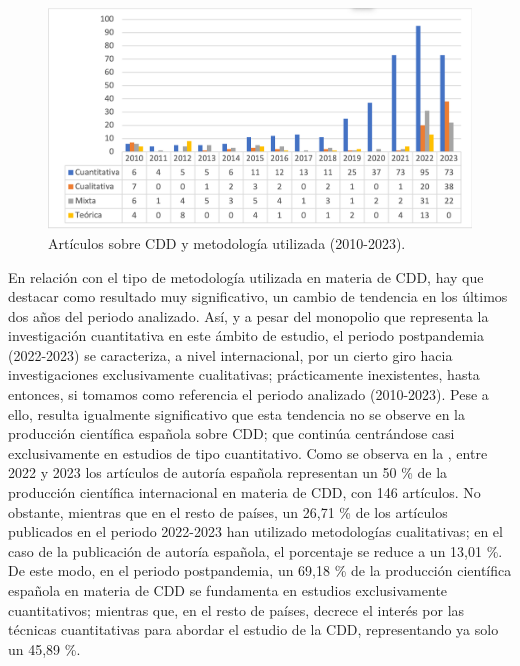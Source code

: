 \documentclass[spanish]{textolivre}
\begin{document}
\begin{figure}[h]
    \centering
    \begin{minipage}{.8\textwidth} 
    \includegraphics[width=\linewidth]{images/image4.png}
    \caption{Artículos sobre CDD y metodología utilizada (2010-2023).}
    \label{fig-4}
    \end{minipage}
\end{figure}

En relación con el tipo de metodología utilizada en materia de CDD, hay que destacar como resultado muy significativo, un cambio de tendencia en los últimos dos años del periodo analizado. Así, y a pesar del monopolio que representa la investigación cuantitativa en este ámbito de estudio, el periodo postpandemia (2022-2023) se caracteriza, a nivel internacional, por un cierto giro hacia investigaciones exclusivamente cualitativas; prácticamente inexistentes, hasta entonces, si tomamos como referencia el periodo analizado (2010-2023). Pese a ello, resulta igualmente significativo que esta tendencia no se observe en la producción científica española sobre CDD; que continúa centrándose casi exclusivamente en estudios de tipo cuantitativo. Como se observa en la , entre 2022 y 2023 los artículos de autoría española representan un 50 \% de la producción científica internacional en materia de CDD, con 146 artículos. No obstante, mientras que en el resto de países, un 26,71 \% de los artículos publicados en el periodo 2022-2023 han utilizado metodologías cualitativas; en el caso de la publicación de autoría española, el porcentaje se reduce a un 13,01 \%. De este modo, en el periodo postpandemia, un 69,18 \% de la producción científica española en materia de CDD se fundamenta en estudios exclusivamente cuantitativos; mientras que, en el resto de países, decrece el interés por las técnicas cuantitativas para abordar el estudio de la CDD, representando ya solo un 45,89 \%.
\end{document}
